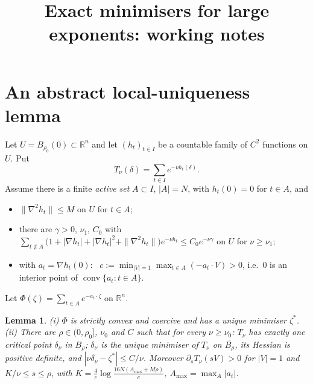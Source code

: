 \documentclass[11pt]{article}
\title{Exact minimisers for large exponents: working notes}
\date{}
\newtheorem{lemma}[theorem]{Lemma}
\theoremstyle{remark}\newtheorem{remark}[theorem]{Remark}
\newcommand{\R}{\mathbb R}\newcommand{\Z}{\mathbb Z}
\begin{document}
\maketitle

\section{An abstract local-uniqueness lemma}
Let $U=B_{\rho_0}(0)\subset\R^n$ and let $(h_t)_{t\in I}$ be a countable family of $C^2$ functions on $U$. Put
\[T_\nu(\delta)=\sum_{t\in I}e^{-\nu h_t(\delta)} .\]
Assume there is a finite \emph{active set} $A\subset I$, $|A|=N$, with $h_t(0)=0$ for $t\in A$, and
\begin{itemize}
\item[(H1)] $\|\nabla^2h_t\|\le M$ on $U$ for $t\in A$;
\item[(H2)] there are $\gamma>0$, $\nu_1$, $C_0$ with $\sum_{t\notin A}\bigl(1+|\nabla h_t|+|\nabla h_t|^2+\|\nabla^2h_t\|\bigr)e^{-\nu h_t}\le C_0e^{-\nu\gamma}$ on $U$ for $\nu\ge\nu_1$;
\item[(H3)] with $a_t=\nabla h_t(0)$: \ $c:=\min_{|V|=1}\max_{t\in A}(-a_t\cdot V)>0$, i.e.\ $0$ is an interior point of $\operatorname{conv}\{a_t:t\in A\}$.
\end{itemize}
Let $\Phi(\zeta)=\sum_{t\in A}e^{-a_t\cdot\zeta}$ on $\R^n$.

\begin{lemma}\label{lem:abstract}
(i) $\Phi$ is strictly convex and coercive and has a unique minimiser $\zeta^*$.
(ii) There are $\rho\in(0,\rho_0]$, $\nu_0$ and $C$ such that for every $\nu\ge\nu_0$: $T_\nu$ has exactly one critical point $\delta_\nu$ in $B_\rho$; $\delta_\nu$ is the unique minimiser of $T_\nu$ on $\overline{B_\rho}$, its Hessian is positive definite, and $|\nu\delta_\nu-\zeta^*|\le C/\nu$. Moreover $\partial_sT_\nu(sV)>0$ for $|V|=1$ and $K/\nu\le s\le\rho$, with $K=\frac4c\log\frac{16N(A_{\max}+M\rho)}{c}$, $A_{\max}=\max_A|a_t|$.
\end{lemma}
\end{document}
